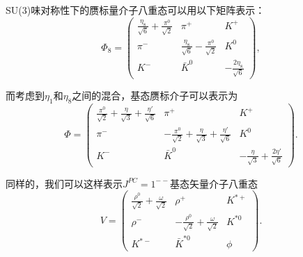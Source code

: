 SU(3)味对称性下的赝标量介子八重态可以用以下矩阵表示：
\begin{equation}
    \Phi_8 = \begin{pmatrix}
    \frac{\eta_8}{\sqrt{6}} + \frac{\pi^0}{\sqrt{2}} & \pi^+ & K^+ \\
    \pi^- & \frac{\eta_8}{\sqrt{6}} - \frac{\pi^0}{\sqrt{2}} & K^0 \\
    K^- & \bar{K}^0 & -\frac{2\eta_8}{\sqrt{6}}
    \end{pmatrix} ,
\end{equation}

而考虑到$\eta_1$和$\eta_8$之间的混合，基态赝标介子可以表示为
\begin{equation}
    \Phi = \begin{pmatrix}
    \frac{\pi^0}{\sqrt{2}} + \frac{\eta}{\sqrt{3}} + \frac{\eta'}{\sqrt{6}} & \pi^+ & K^+ \\
    \pi^- & -\frac{\pi^0}{\sqrt{2}} + \frac{\eta}{\sqrt{3}} + \frac{\eta'}{\sqrt{6}} & K^0 \\
    K^- & \bar{K}^0 & -\frac{\eta}{\sqrt{3}} + \frac{2\eta'}{\sqrt{6}}
    \end{pmatrix} .
\end{equation}

同样的，我们可以这样表示$J^{PC} = 1^{--}$基态矢量介子八重态
\begin{equation}
    V = \begin{pmatrix}
    \frac{\rho^0}{\sqrt{2}} + \frac{\omega}{\sqrt{2}} & \rho^+ & K^{*+} \\
    \rho^- & -\frac{\rho^0}{\sqrt{2}} + \frac{\omega}{\sqrt{2}} & K^{*0} \\
    K^{*-} & \bar{K}^{*0} & \phi
    \end{pmatrix} .
\end{equation}

